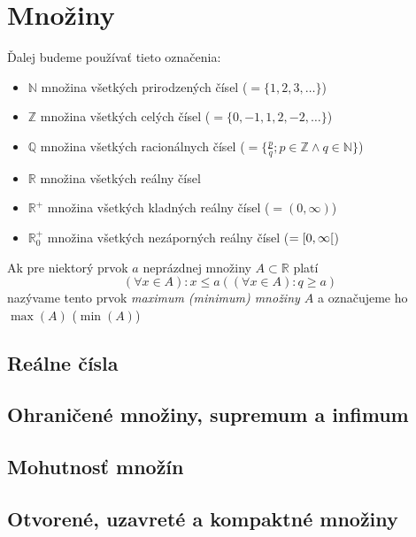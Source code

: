 \chapter{Množiny}


Ďalej budeme používať tieto označenia:
\begin{itemize}[label=]
  \item $\mathbb{N}$ množina všetkých prirodzených čísel ($= \{ 1, 2, 3, \ldots \}$)
  \item $\mathbb{Z}$ množina všetkých celých čísel ($= \{ 0, -1, 1, 2, -2, \ldots \}$)
  \item $\mathbb{Q}$ množina všetkých racionálnych čísel
    ($= \{ \frac{p}{q}; p \in \mathbb{Z} \land q \in \mathbb{N} \}$)
  \item $\mathbb{R}$ množina všetkých reálny čísel
  \item $\mathbb{R}^+$ množina všetkých kladných reálny čísel ($= ( 0, \infty )$)
  \item $\mathbb{R}^+_0$ množina všetkých nezáporných reálny čísel
    ($= \interval[open right]{0}{\infty}$)
\end{itemize}
Ak pre niektorý prvok $a$ neprázdnej množiny $A \subset \mathbb{R}$ platí
\[
  (\forall x \in A) : x \leq a ((\forall x \in A): q \geq a)
\]
nazývame tento prvok \emph{maximum (minimum) množiny $A$} a označujeme ho
$\max(A)$ ($\min(A)$)

\section{Reálne čísla}


\section{Ohraničené množiny, supremum a infimum}


\section{Mohutnosť množín}


\section{Otvorené, uzavreté a kompaktné množiny}

